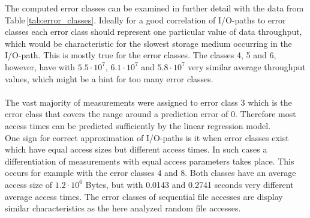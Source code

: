 \documentclass{superfri}
\begin{document}
The computed error classes can be examined in further detail with the data from Table\,\ref{tab:error_classes}.
Ideally for a good correlation of I/O-paths to error classes each error class should represent one particular value of data throughput, which would be characteristic for the slowest storage medium occurring in the I/O-path. 
This is mostly true for the error classes. The classes 4, 5 and 6, however, have with $5.5\cdot10^7$, $6.1\cdot10^7$ and $5.8\cdot10^7$ very similar average throughput values, which might be a hint for too many error classes.\\
\\
The vast majority of measurements were assigned to error class 3 which is the error class that covers the range around a prediction error of 0.
Therefore most access times can be predicted sufficiently by the linear regression model.\\
One sign for correct approximation of I/O-paths is it when error classes exist which have equal access sizes but different access times.
In such cases a differentiation of measurements with equal access parameters takes place.
This occurs for example with the error classes 4 and 8. Both classes have an average access size of $1.2\cdot10^6$ Bytes, but with 0.0143 and 0.2741 seconds very different average access times.
The error classes of sequential file accesses are display similar characteristics as the here analyzed random file accesses.
\end{document}
